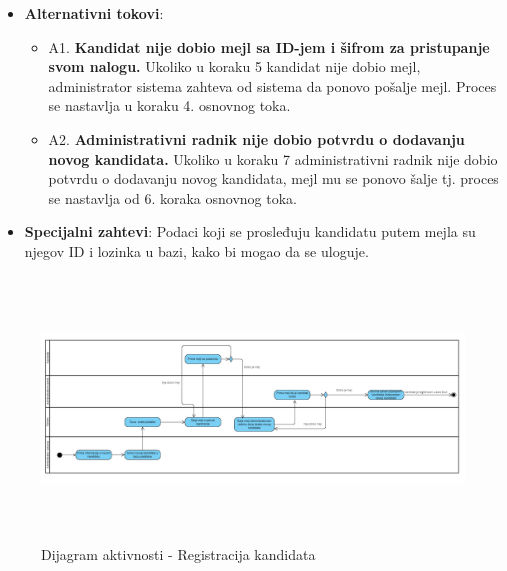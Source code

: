 \begin{itemize}
      \newpage
  \item \textbf{Alternativni tokovi}:
      \begin{itemize}
        \item A1. \textbf{Kandidat nije dobio mejl sa ID-jem i šifrom za pristupanje svom nalogu.}
        Ukoliko u koraku 5 kandidat nije dobio mejl, administrator sistema zahteva od sistema da ponovo pošalje mejl. Proces se nastavlja u koraku 4. osnovnog toka.
        \item A2. \textbf{Administrativni radnik nije dobio potvrdu o dodavanju novog kandidata.}
        Ukoliko u koraku 7 administrativni radnik nije dobio potvrdu o dodavanju novog kandidata, mejl mu se ponovo šalje tj. proces se nastavlja od 6. koraka osnovnog toka.
      \end{itemize}


  \item \textbf{Specijalni zahtevi}:\newline
  Podaci koji se prosleđuju kandidatu putem mejla su njegov ID i lozinka u bazi, kako bi mogao da se uloguje.
\end{itemize}

\begin{figure}[H]
  \begin{center}
      \includegraphics[width=140mm, height=70mm]{Diagrams/dijagram_aktivnosti_registracija_kandidata.png}
  \end{center}
  \caption {Dijagram aktivnosti - Registracija kandidata}
  \label{activity_registracija}

\end{figure}

